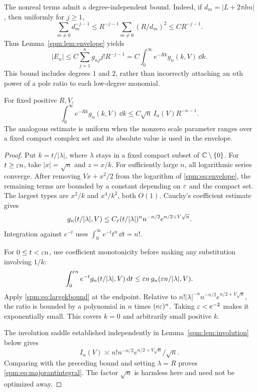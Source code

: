 The nonreal terms admit a degree-independent bound. Indeed, if $d_m=|L+2\pi\ii m|$, then uniformly for $j\geq1$,
\[
 \sum_{m\ne0}d_m^{-j-1}
 \leq R^{-j-1}\sum_{m\ne0}(R/d_m)^2
 \leq C R^{-j-1}.
\]
Thus Lemma~\ref{spm:lem:envelope} yields
\begin{equation}\label{spm:eq:allpolebound}
 |E_n|\leq C\sum_{j=1}^n g_{nj}j!R^{-j-1}
 =C\int_0^\infty e^{-Rk}g_n(k,V)\,\dd k.
\end{equation}
This bound includes degrees $1$ and $2$, rather than incorrectly attaching an $n$th power of a pole ratio to each low-degree monomial.

\begin{lemma}\label{spm:lem:gammabound}
For fixed positive $R,V$,
\begin{equation}\label{spm:eq:majorantintegral}
 \int_0^\infty e^{-Rk}g_n(k,V)\,\dd k
 \leq C\sqrt n\,I_n(V)R^{-n-1}.
\end{equation}
The analogous estimate is uniform when the nonzero scale parameter ranges over a fixed compact complex set and its absolute value is used in the envelope.
\end{lemma}
\begin{proof}
Put $k=t/|\lambda|$, where $\lambda$ stays in a fixed compact subset of $\mathbb C\setminus\{0\}$. For $t\geq\varepsilon n$, take $|x|=\sqrt n$ and $z=x/k$. For sufficiently large $n$, all logarithmic series converge. After removing $Vx+x^2/2$ from the logarithm of \eqref{spm:eq:envelope}, the remaining terms are bounded by a constant depending on $\varepsilon$ and the compact set. The largest types are $x^2/k$ and $x^4/k^2$, both $O(1)$. Cauchy's coefficient estimate gives
\begin{equation}\label{spm:eq:largekbound}
 g_n(t/|\lambda|,V)
 \leq C_\varepsilon(t/|\lambda|)^n n^{-n/2}e^{n/2+V\sqrt n}.
\end{equation}
Integration against $e^{-t}$ uses $\int_0^\infty e^{-t}t^n\,\dd t=n!$.

For $0\leq t<\varepsilon n$, use coefficient monotonicity before making any substitution involving $1/k$:
\[
 \int_0^{\varepsilon n}e^{-t}g_n(t/|\lambda|,V)\,\mathrm d t
 \leq \varepsilon n\,g_n(\varepsilon n/|\lambda|,V).
\]
Apply \eqref{spm:eq:largekbound} at the endpoint. Relative to
$n!|\lambda|^{-n}n^{-n/2}e^{n/2+V\sqrt n}$, the ratio is bounded by a polynomial in $n$ times $(e\varepsilon)^n$. Taking $\varepsilon<e^{-2}$ makes it exponentially small. This covers $k=0$ and arbitrarily small positive $k$.

The involution saddle established independently in Lemma~\ref{spm:lem:involution} below gives
\[
 I_n(V)\asymp n!n^{-n/2}e^{n/2+V\sqrt n}/\sqrt n.
\]
Comparing with the preceding bound and setting $\lambda=R$ proves \eqref{spm:eq:majorantintegral}. The factor $\sqrt n$ is harmless here and need not be optimized away.
\end{proof}

